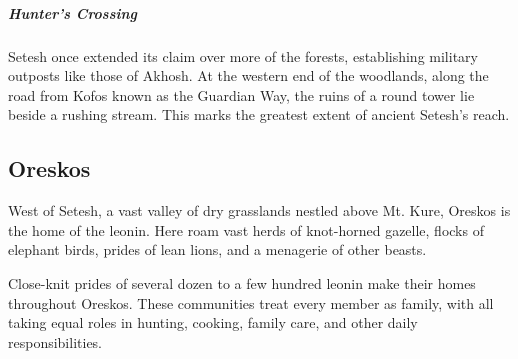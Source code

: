        \subparagraph{Hunter's Crossing} Setesh once extended its claim over more of the forests, establishing military outposts like those of Akhosh.
        At the western end of the woodlands, along the road from Kofos known as the Guardian Way, the ruins of a round tower lie beside a rushing stream.
        This marks the greatest extent of ancient Setesh's reach.

\subsection*{Oreskos}
    West of Setesh, a vast valley of dry grasslands nestled above Mt. Kure, Oreskos is the home of the leonin.
    Here roam vast herds of knot-horned gazelle, flocks of elephant birds, prides of lean lions, and a menagerie of other beasts.

    Close-knit prides of several dozen to a few hundred leonin make their homes throughout Oreskos.
    These communities treat every member as family, with all taking equal roles in hunting, cooking, family care, and other daily responsibilities.

%
